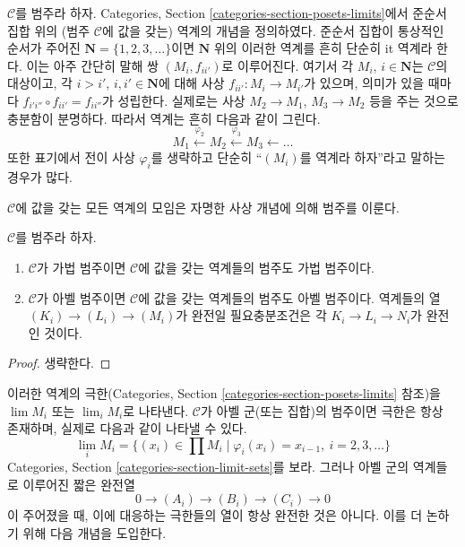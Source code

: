 \noindent
$\mathcal{C}$를 범주라 하자. Categories, Section
\ref{categories-section-posets-limits}에서 준순서 집합 위의
(범주 $\mathcal{C}$에 값을 갖는) 역계의 개념을 정의하였다.
준순서 집합이 통상적인 순서가 주어진
$\mathbf{N} = \{1, 2, 3, \ldots\}$이면 $\mathbf{N}$ 위의 이러한
역계를 흔히 단순히 {it 역계}라 한다. 이는 아주 간단히 말해 쌍
$(M_i, f_{ii'})$로 이루어진다. 여기서 각 $M_i$, $i \in \mathbf{N}$는
$\mathcal{C}$의 대상이고, 각 $i > i'$, $i, i' \in \mathbf{N}$에 대해
사상 $f_{ii'} : M_i \to M_{i'}$가 있으며, 의미가 있을 때마다
$f_{i'i''} \circ f_{ii'} = f_{ii''}$가 성립한다. 실제로는 사상
$M_2 \to M_1$, $M_3 \to M_2$ 등을 주는 것으로 충분함이 분명하다.
따라서 역계는 흔히 다음과 같이 그린다.
$$
M_1 \xleftarrow{\varphi_2} M_2 \xleftarrow{\varphi_3} M_3 \leftarrow \ldots
$$
또한 표기에서 전이 사상 $\varphi_i$를 생략하고 단순히
“$(M_i)$를 역계라 하자”라고 말하는 경우가 많다.

\medskip\noindent
$\mathcal{C}$에 값을 갖는 모든 역계의 모임은 자명한 사상 개념에 의해
범주를 이룬다.

\begin{lemma}
\label{lemma-inverse-systems-abelian}
$\mathcal{C}$를 범주라 하자.
\begin{enumerate}
\item $\mathcal{C}$가 가법 범주이면 $\mathcal{C}$에 값을 갖는 역계들의
범주도 가법 범주이다.
\item $\mathcal{C}$가 아벨 범주이면 $\mathcal{C}$에 값을 갖는 역계들의
범주도 아벨 범주이다. 역계들의 열 $(K_i) \to (L_i) \to (M_i)$가
완전일 필요충분조건은 각 $K_i \to L_i \to N_i$가 완전인 것이다.
\end{enumerate}
\end{lemma}

\begin{proof}
생략한다.
\end{proof}

\noindent
이러한 역계의 극한(Categories, Section
\ref{categories-section-posets-limits} 참조)을 $\lim M_i$ 또는
$\lim_i M_i$로 나타낸다. $\mathcal{C}$가 아벨 군(또는 집합)의 범주이면
극한은 항상 존재하며, 실제로 다음과 같이 나타낼 수 있다.
$$
\lim_i M_i
=
\{(x_i) \in \prod M_i \mid \varphi_i(x_i) = x_{i - 1}, \ i = 2, 3, \ldots\}
$$
Categories, Section \ref{categories-section-limit-sets}를 보라.
그러나 아벨 군의 역계들로 이루어진 짧은 완전열
$$
0 \to (A_i) \to (B_i) \to (C_i) \to 0
$$
이 주어졌을 때, 이에 대응하는 극한들의 열이 항상 완전한 것은 아니다.
이를 더 논하기 위해 다음 개념을 도입한다.

